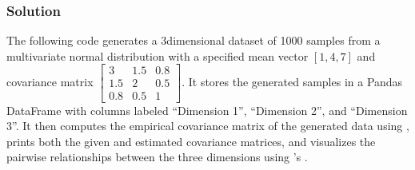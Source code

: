 \documentclass[letterpaper,10pt,english]{jupyterBook}
\begin{document}
\subsubsection{Solution}
\label{\detokenize{01:id10}}
\sphinxAtStartPar
The following code generates a 3\sphinxhyphen{}dimensional dataset of 1000 samples from a multivariate normal distribution with a specified mean vector \([1, 4, 7]\) and covariance matrix \(\begin{bmatrix} 3 & 1.5 & 0.8 \\ 1.5 & 2 & 0.5 \\ 0.8 & 0.5 & 1 \end{bmatrix}\). It stores the generated samples in a Pandas DataFrame with columns labeled “Dimension 1”, “Dimension 2”, and “Dimension 3”. It then computes the empirical covariance matrix of the generated data using , prints both the given and estimated covariance matrices, and visualizes the pairwise relationships between the three dimensions using ’s .
\end{document}
